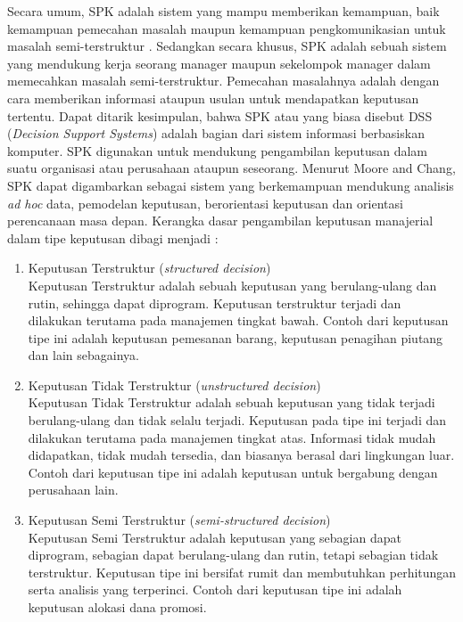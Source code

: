 Secara umum, SPK adalah sistem yang mampu memberikan kemampuan, baik kemampuan pemecahan masalah maupun kemampuan pengkomunikasian untuk masalah semi-terstruktur \cite{spk1}. Sedangkan secara khusus, SPK adalah sebuah sistem yang mendukung kerja seorang manager maupun sekelompok manager dalam memecahkan masalah semi-terstruktur. Pemecahan masalahnya adalah dengan cara memberikan informasi ataupun usulan untuk mendapatkan keputusan tertentu. Dapat ditarik kesimpulan, bahwa SPK atau yang biasa disebut DSS (\textit{Decision Support Systems}) adalah bagian dari sistem informasi berbasiskan komputer. SPK digunakan untuk mendukung pengambilan keputusan dalam suatu organisasi atau perusahaan ataupun seseorang. Menurut Moore and Chang, SPK dapat digambarkan sebagai sistem yang berkemampuan mendukung analisis \textit{ad hoc} data, pemodelan keputusan, berorientasi keputusan dan orientasi perencanaan masa depan. Kerangka dasar pengambilan keputusan manajerial dalam tipe keputusan dibagi menjadi  \cite{spk1}:	
	\begin{enumerate}
		\item Keputusan Terstruktur (\textit{structured decision}) \\
		Keputusan Terstruktur adalah sebuah keputusan yang berulang-ulang dan rutin, sehingga dapat diprogram. Keputusan terstruktur terjadi dan dilakukan terutama pada manajemen tingkat bawah. Contoh dari keputusan tipe ini adalah keputusan pemesanan barang, keputusan penagihan piutang dan lain sebagainya.
		\item Keputusan Tidak Terstruktur (\textit{unstructured decision})\\
		Keputusan Tidak Terstruktur adalah sebuah keputusan yang tidak terjadi berulang-ulang dan tidak selalu terjadi. Keputusan pada tipe ini terjadi dan dilakukan terutama pada manajemen tingkat atas. Informasi tidak mudah didapatkan, tidak mudah tersedia, dan biasanya berasal dari lingkungan luar. Contoh dari keputusan tipe ini adalah keputusan untuk bergabung dengan perusahaan lain.
		\item Keputusan Semi Terstruktur (\textit{semi-structured decision})\\
		Keputusan Semi Terstruktur adalah keputusan yang sebagian dapat diprogram, sebagian dapat berulang-ulang dan rutin, tetapi sebagian tidak terstruktur. Keputusan tipe ini bersifat rumit dan membutuhkan perhitungan serta analisis yang terperinci. Contoh dari keputusan tipe ini adalah keputusan alokasi dana promosi.
	\end{enumerate}
	
